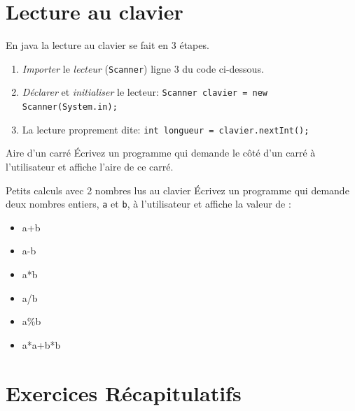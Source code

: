 \documentclass[a4paper,11pt]{article}
\begin{document}
\section{Lecture au clavier}


	En java la lecture au clavier se fait en 3 étapes.

	\begin{enumerate}
		\item \emph{Importer} le \emph{lecteur} (\texttt{Scanner}) ligne 3 du code ci-dessous.
		\item \emph{Déclarer} et \emph{initialiser} le lecteur:  \texttt{Scanner clavier = new Scanner(System.in);}
		\item La lecture proprement dite: \texttt{int longueur = clavier.nextInt();}
	\end{enumerate}



	\begin{Exercice}{Aire d'un carré}
		\'Ecrivez un programme qui demande 
		le côté d'un carré à l'utilisateur et affiche l'aire de ce carré.
	\end{Exercice}

	\begin{Exercice}{Petits calculs avec 2 nombres lus au clavier} 
		\'Ecrivez un programme qui demande 
		deux nombres entiers, \texttt{a} et \texttt{b}, à l'utilisateur et affiche la valeur de :
		\begin{itemize}
		 	\item a+b
			\item a-b
			\item a*b
			\item a/b
			\item a\%b
			\item a*a+b*b
		\end{itemize} 
	\end{Exercice}


\section{Exercices Récapitulatifs}

%
		
\end{document}
